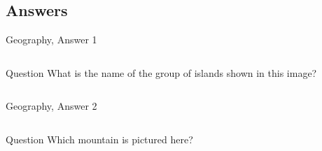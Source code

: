 \documentclass[11pt]{beamer}
\begin{document}
\subsection{Answers}
\begin{frame}[t]{Geography, Answer 1}
\begin{columns}[T,totalwidth=\linewidth]
\begin{column}{0.32\linewidth}
\begin{block}{Question}
What is the name of the group of islands shown in this image?
\end{block}
\end{column}
\begin{column}{0.65\linewidth}
\begin{center}
\texttt{[image: \{Images/galapagos]}.png}
\end{center}
\end{column}
\end{columns}
\end{frame}
\begin{frame}[t]{Geography, Answer 2}
\begin{columns}[T,totalwidth=\linewidth]
\begin{column}{0.32\linewidth}
\begin{block}{Question}
Which mountain is pictured here?
\end{block}
\end{column}
\begin{column}{0.65\linewidth}
\begin{center}
\texttt{[image: \{Images/materhorn]}.jpg}
\end{center}
\end{column}
\end{columns}
\end{frame}
\end{document}
